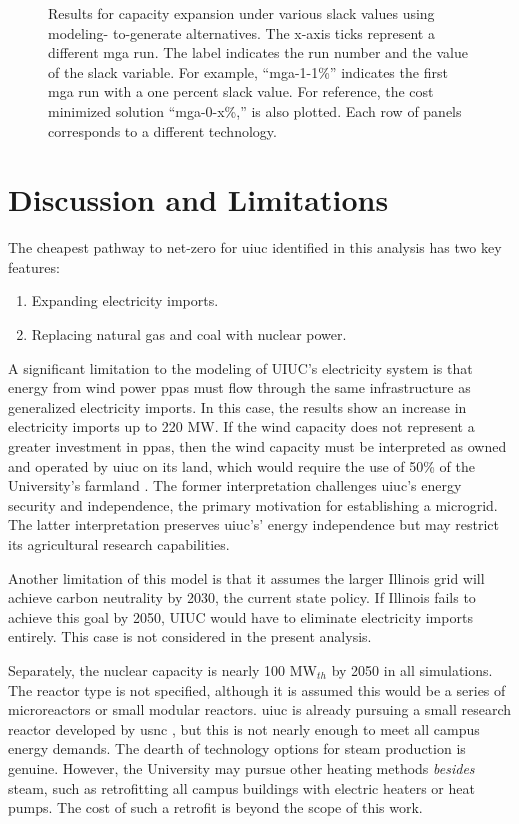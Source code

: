\begin{figure}[H]
  \centering
  \resizebox{0.95\columnwidth}{!}{}
  \caption{Results for capacity expansion under various slack values using modeling-
  to-generate alternatives. The x-axis ticks represent a different \gls{mga} run.
  The label indicates the run number and the value of the slack variable. For example,
  ``mga-1-1\%'' indicates the first \gls{mga} run with a one percent
  slack value. For reference, the cost minimized solution ``mga-0-x\%,'' is also
  plotted. Each row of panels corresponds to a different technology.}
  \label{fig:uiuc_chw_mga}
\end{figure}

\section{Discussion and Limitations}
The cheapest pathway to net-zero for \gls{uiuc} identified in this analysis has two key features:
\begin{enumerate}
\item Expanding electricity imports.
\item Replacing natural gas and coal with nuclear power.
\end{enumerate}
A significant limitation to the modeling of UIUC’s electricity system is that energy
from wind power \glspl{ppa} must flow through the same infrastructure as generalized
electricity imports. In this case, the results show an increase in electricity
imports up to 220 MW. If the wind capacity does not represent a greater investment
in \glspl{ppa}, then the wind capacity must be interpreted as owned and operated
by \gls{uiuc} on its land, which would require the use of 50\% of the University's
farmland \cite{lopez_us_2012}. The former interpretation challenges \gls{uiuc}'s
energy security and independence, the primary motivation for establishing a microgrid.
The latter interpretation preserves \gls{uiuc}'s' energy independence but may restrict
its agricultural research capabilities.

Another limitation of this model is that it assumes the larger Illinois grid will
achieve carbon neutrality by 2030, the current state policy. If Illinois fails to
achieve this goal by 2050, UIUC would have to eliminate electricity imports entirely.
This case is not considered in the present analysis.

Separately, the nuclear capacity is nearly 100 MW$_{th}$ by 2050 in all simulations.
The reactor type is not specified, although it is assumed this would be a series
of microreactors or small modular reactors. \gls{uiuc} is already pursuing a small
research reactor developed by \gls{usnc} \cite{noauthor_university_2021}, but this
is not nearly enough to meet all campus energy demands. The dearth of technology
options for steam production is genuine. However, the University may pursue other heating
methods \textit{besides} steam, such as retrofitting all campus buildings with electric
heaters or heat pumps. The cost of such a retrofit is beyond the scope of this work.

